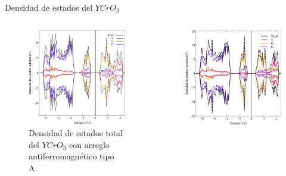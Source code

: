 \begin{frame}{Densidad de estados del $YCrO_{3}$}
\begin{columns}[t]
    \begin{figure}[H]
        \centering
        \includegraphics[width=1.0\textwidth]{contenido/resultados/img_resultados/YCO_DOS_A.png}
        \caption{Densidad de estados total del $YCrO_{3}$ con arreglo         
            antiferromagn\'etico tipo A.}
    \end{figure}
    \begin{figure}[H]
        \centering
        \includegraphics[width=1.0\textwidth]{contenido/resultados/img_resultados/YCO_DOS_C.png}

\end{figure}
\end{columns}
\end{frame}
